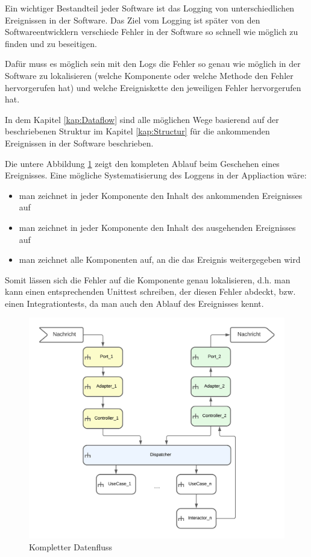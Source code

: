 Ein wichtiger Bestandteil jeder Software ist das Logging von unterschiedlichen Ereignissen in der Software.
Das Ziel vom Logging ist später von den Softwareentwicklern verschiede Fehler in der Software so schnell wie möglich zu finden und
zu beseitigen.

Dafür muss es möglich sein mit den Logs die Fehler so genau wie möglich in der Software zu lokalisieren 
(welche Komponente oder welche Methode den Fehler hervorgerufen hat) 
und welche Ereigniskette den jeweiligen Fehler hervorgerufen hat.

In dem Kapitel \ref{kap:Dataflow} sind alle möglichen Wege basierend auf der beschriebenen Struktur 
im Kapitel \ref{kap:Structur} für die ankommenden Ereignissen in der Software beschrieben.

Die untere Abbildung \ref{fig:FullDataFlow} zeigt den kompleten Ablauf beim Geschehen eines Ereignisses.
Eine mögliche Systematisierung des Loggens in der Appliaction wäre: 
\begin{itemize}
    \item man zeichnet in jeder Komponente den Inhalt des ankommenden Ereignisses auf
    \item man zeichnet in jeder Komponente den Inhalt des ausgehenden Ereignisses auf
    \item man zeichnet alle Komponenten auf, an die das Ereignis weitergegeben wird
\end{itemize}

Somit lässen sich die Fehler auf die Komponente genau lokalisieren, d.h. man kann einen entsprechenden Unittest schreiben, 
der diesen Fehler abdeckt, bzw. einen Integrationtests, da man auch den Ablauf des Ereignisses kennt.

\begin{figure}[H]
    \centering
    \includegraphics[width=12cm]{./images/FullDataFlow.png}
     \caption[Kompletter Datenfluss]{Kompletter Datenfluss \footnotemark}
     \label{fig:FullDataFlow}
\end{figure}
